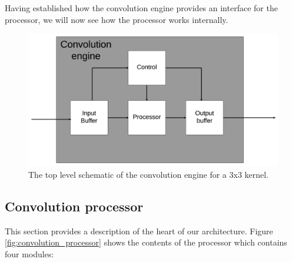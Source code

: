 Having established how the convolution engine provides an interface for the processor, we will now see how the processor works internally.

\begin{figure}[h!]
    \includegraphics[width=\linewidth]{img/convolution_engine.png}
    \caption{The top level schematic of the convolution engine for a 3x3 kernel.}
    \label{fig:conv_engine}
\end{figure}

\subsection{Convolution processor}
This section provides a description of the heart of our architecture.
Figure \ref{fig:convolution_processor} shows the contents of the processor which contains four modules:

